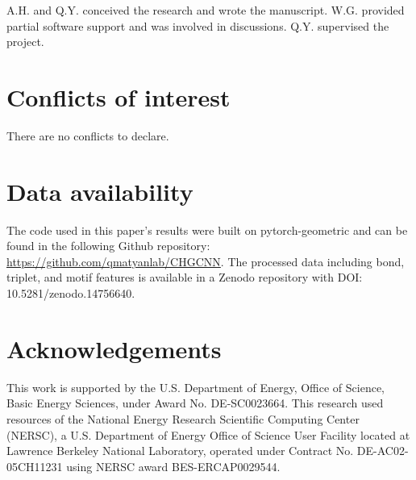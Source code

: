 \documentclass[twoside,twocolumn,9pt]{article}
\begin{document}
A.H. and Q.Y. conceived the research and wrote the manuscript. W.G. provided partial software support and was involved in discussions. Q.Y. supervised the project.

\section*{Conflicts of interest}
There are no conflicts to declare.

\section*{Data availability}
The code used in this paper's results were built on pytorch-geometric and can be found in the following Github repository: \hyperlink{https://github.com/qmatyanlab/CHGCNN}{https://github.com/qmatyanlab/CHGCNN}. The processed data including bond, triplet, and motif features is available in a Zenodo repository with DOI: 10.5281/zenodo.14756640.


\section*{Acknowledgements}
This work is supported by the U.S. Department of Energy, Office of Science, Basic Energy Sciences, under Award No. DE-SC0023664. This research used resources of the National Energy Research Scientific Computing Center (NERSC), a U.S. Department of Energy Office of Science User Facility located at Lawrence Berkeley National Laboratory, operated under Contract No. DE-AC02-05CH11231 using NERSC award BES-ERCAP0029544.



\balance


\end{document}

